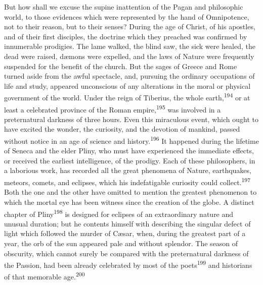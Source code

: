 
But how shall we excuse the supine inattention of the Pagan and
philosophic world, to those evidences which were represented by
the hand of Omnipotence, not to their reason, but to their
senses? During the age of Christ, of his apostles, and of their
first disciples, the doctrine which they preached was confirmed
by innumerable prodigies. The lame walked, the blind saw, the
sick were healed, the dead were raised, dæmons were expelled, and
the laws of Nature were frequently suspended for the benefit of
the church. But the sages of Greece and Rome turned aside from
the awful spectacle, and, pursuing the ordinary occupations of
life and study, appeared unconscious of any alterations in the
moral or physical government of the world. Under the reign of
Tiberius, the whole earth,\textsuperscript{194} or at least a celebrated province
of the Roman empire,\textsuperscript{195} was involved in a preternatural darkness
of three hours. Even this miraculous event, which ought to have
excited the wonder, the curiosity, and the devotion of mankind,
passed without notice in an age of science and history.\textsuperscript{196} It
happened during the lifetime of Seneca and the elder Pliny, who
must have experienced the immediate effects, or received the
earliest intelligence, of the prodigy. Each of these
philosophers, in a laborious work, has recorded all the great
phenomena of Nature, earthquakes, meteors, comets, and eclipses,
which his indefatigable curiosity could collect.\textsuperscript{197} Both the one
and the other have omitted to mention the greatest phenomenon to
which the mortal eye has been witness since the creation of the
globe. A distinct chapter of Pliny\textsuperscript{198} is designed for eclipses
of an extraordinary nature and unusual duration; but he contents
himself with describing the singular defect of light which
followed the murder of Cæsar, when, during the greatest part of a
year, the orb of the sun appeared pale and without splendor. The
season of obscurity, which cannot surely be compared with the
preternatural darkness of the Passion, had been already
celebrated by most of the poets\textsuperscript{199} and historians of that
memorable age.\textsuperscript{200}

